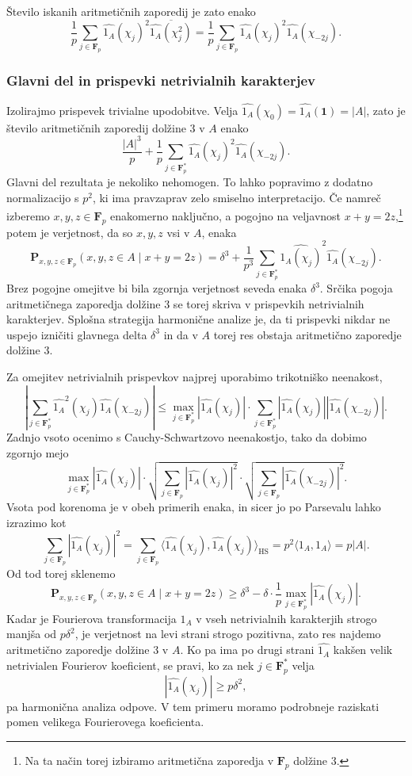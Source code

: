\documentclass[11pt]{book}
\def\oneone{\mathbf{1}}
\def\FF{\mathbf{F}}
\def\PP{\mathbf{P}}
\DeclareMathOperator\HS{HS}
\theoremstyle{definition}
\theoremstyle{zgled}
\theoremstyle{zgledbrezstevilke}
\theoremstyle{odprtproblem}
\theoremstyle{domacanaloga}
\theoremstyle{izrek}
\begin{document}
Število iskanih aritmetičnih zaporedij je zato enako
\[
    \frac{1}{p} \sum_{j \in \FF_p} \widehat{1_A}(\chi_j)^2 \overline{\widehat{1_A}(\chi_j^2)}
    = \frac{1}{p} \sum_{j \in \FF_p} \widehat{1_A}(\chi_j)^2 \widehat{1_A}(\chi_{-2j}).
\]

\subsubsection{Glavni del in prispevki netrivialnih karakterjev}

Izolirajmo prispevek trivialne upodobitve. Velja $\widehat{1_A}(\chi_0) = \widehat{1_A}(\oneone) = |A|$, zato je število aritmetičnih zaporedij dolžine $3$ v $A$ enako
\[
    \frac{|A|^3}{p} +  \frac{1}{p} \sum_{j \in \FF_p^*} \widehat{1_A}(\chi_j)^2 \widehat{1_A}(\chi_{-2j}).
\]
Glavni del rezultata je nekoliko nehomogen. To lahko popravimo z dodatno normalizacijo s $p^2$, ki ima pravzaprav zelo smiselno interpretacijo. Če namreč izberemo $x,y,z \in \FF_p$ enakomerno naključno, a pogojno na veljavnost $x+y=2z$,\footnote{Na ta način torej izbiramo aritmetična zaporedja v $\FF_p$ dolžine $3$.} potem je verjetnost, da so $x,y,z$ vsi v $A$, enaka
\[
    \PP_{x,y,z \in \FF_p}(x,y,z \in A \mid x+y=2z) =
    \delta^3 + \frac{1}{p^3} \sum_{j \in \FF_p^*} \widehat{1_A(\chi_j)}^2 \widehat{1_A}(\chi_{-2j}).
\]
Brez pogojne omejitve bi bila zgornja verjetnost seveda enaka $\delta^3$. Srčika pogoja aritmetičnega zaporedja dolžine $3$ se torej skriva v prispevkih netrivialnih karakterjev. Splošna strategija harmonične analize je, da ti prispevki nikdar ne uspejo izničiti glavnega delta $\delta^3$ in da v $A$ torej res obstaja aritmetično zaporedje dolžine $3$. 

Za omejitev netrivialnih prispevkov najprej uporabimo trikotniško neenakost,
\[
    \left| \sum_{j \in \FF_p^*} \widehat{1_A}^2(\chi_j) \widehat{1_A}(\chi_{-2j}) \right|
    \leq \max_{j \in \FF_p^*} |\widehat{1_A}(\chi_j)| \cdot 
    \sum_{j \in \FF_p^*} 
    |\widehat{1_A}(\chi_j)|
    |\widehat{1_A}(\chi_{-2j})|.
\]
Zadnjo vsoto ocenimo s Cauchy-Schwartzovo neenakostjo, tako da dobimo zgornjo mejo
\[
    \max_{j \in \FF_p^*} |\widehat{1_A}(\chi_j)| \cdot 
    \sqrt{\sum_{j \in \FF_p} |\widehat{1_A}(\chi_j)|^2} \cdot \sqrt{\sum_{j \in \FF_p} |\widehat{1_A}(\chi_{-2j})|^2}.
\]
Vsota pod korenoma je v obeh primerih enaka, in sicer jo po Parsevalu lahko izrazimo kot
\[
    \sum_{j \in \FF_p} |\widehat{1_A}(\chi_j)|^2
    = \sum_{j \in \FF_p} \langle \widehat{1_A}(\chi_j), \widehat{1_A}(\chi_j) \rangle_{\HS}
    = p^2 \langle 1_A, 1_A \rangle = p |A|.
\]
Od tod torej sklenemo
\[
    \PP_{x,y,z \in \FF_p}(x,y,z \in A \mid x+y=2z)
    \geq \delta^3 - \delta \cdot \frac{1}{p} \max_{j \in \FF_p^*} |\widehat{1_A}(\chi_j)|.
\] 
Kadar je Fourierova transformacija $1_A$ v vseh netrivialnih karakterjih strogo manjša od $p \delta^2$, je verjetnost na levi strani strogo pozitivna, zato res najdemo aritmetično zaporedje dolžine $3$ v $A$. Ko pa ima po drugi strani $\widehat{1_A}$ kakšen velik netrivialen Fourierov koeficient, se pravi, ko za nek $j \in \FF_p^*$ velja
\[
    |\widehat{1_A}(\chi_j)| \geq p \delta^2,
\]
pa harmonična analiza odpove. V tem primeru moramo podrobneje raziskati pomen velikega Fourierovega koeficienta.
\end{document}
